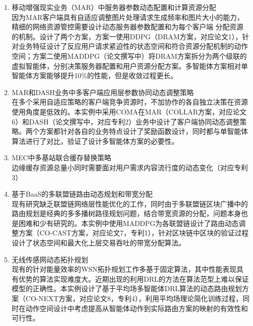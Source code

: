 \documentclass{resume}
\begin{document}
\begin{enumerate}
  \item 移动增强现实业务（MAR）中服务器参数动态配置和计算资源分配
  \\ 因为MAR客户端具有自适应调整图片处理请求生成频率和图片大小的能力，精细的网络资源管控需要设计动态服务器参数配置和为每个客户端 分配资源的机制。设计了两个方案，方案一使用DDPG（DRAM方案，对应论文1），针对业务特征设计了反应用户请求紧迫性的状态空间和符合资源分配机制的动作空间；方案二使用MADDPG（论文撰写中）将DRAM方案拆分为两个级联的虚拟智能体，分别决策服务器配置和用户资源分配方案。多智能体方案相对单智能体方案能够提升10\%的性能，但是收敛过程更长。
  \item MAR和DASH业务中多客户端应用层参数协同动态调整策略
  \\ 在多个采用自适应策略的客户端竞争资源时，不加协作的各自独立决策在资源使用角度是低效的。本实例中采用COMA在MAR（COLLAR方案，对应论文6）和DASH（论文撰写中，对应专利2）业务中设计了客户端协同动态调整策略。两个方案都针对各自的业务特点设计了奖励函数设计，同时都与单智能体算法进行了对比，验证了设计多智能体方案的必要性。
  \item MEC中多基站联合缓存替换策略
  \\ 边缘缓存资源总量小同时需要面对用户需求内容流行度的动态变化（对应专利3）
  \item 基于BaaS的多联盟链路由动态规划和带宽分配
  \\ 现有研究缺乏联盟链网络层性能优化的工作，同时由于多联盟链区块广播中的路由规划是经典的多多播树路径规划问题，结合带宽资源的分配，问题本身也是困难和少有研究的。本实例中使用MADDPG为各联盟链设计了路由动态调整方案（CO-CAST方案，对应论文7，专利1），针对区块链中区块的验证过程设计了状态空间和最大化上层交易吞吐的带宽分配算法。
  \item 无线传感网动态拓扑规划
  \\ 现有的针对能量效率的WSN拓扑规划工作多基于固定算法，其中性能表现具有优势的算法实现难度大。近期出现的利用DRL的方法在算法范型上难以保证模型的正确性。本实例设计了基于平均场多智能体DRL算法的动态路由规划方案（CO-NEXT方案，对应论文8，专利4），利用平均场理论简化训练过程，同时在动作空间设计中考虑提高从智能体动作到实际路由方案的映射的有效性和可行性。
\end{enumerate}
\end{document}
